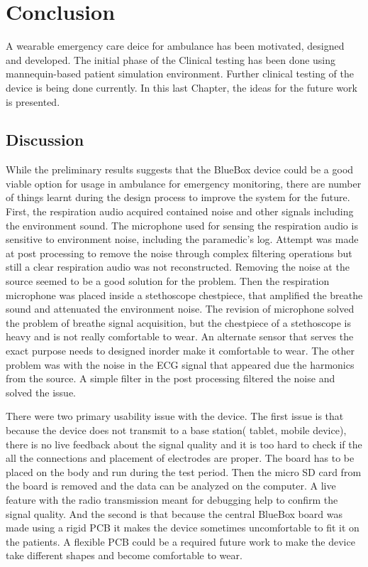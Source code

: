 \chapter{Conclusion}
A wearable emergency care deice for ambulance has been motivated, designed and developed. The initial phase of the Clinical testing has been done using mannequin-based patient simulation environment. Further clinical testing of the device is being done currently. In this last Chapter, the ideas for the future work is presented.

\section{Discussion}
While the preliminary results suggests that the BlueBox device could be a good viable option for usage in ambulance for emergency monitoring, there are number of things learnt during the design process to improve the system for the future. First, the respiration audio acquired contained noise and other signals including the environment sound. The microphone used for sensing the respiration audio is sensitive to environment noise, including the paramedic's log. Attempt was made at post processing to remove the noise through complex filtering operations but still a clear respiration audio was not reconstructed. Removing the noise at the source seemed to be a good solution for the problem. Then the respiration microphone was placed inside a stethoscope chestpiece, that amplified the breathe sound and attenuated the environment noise. The revision of microphone solved the problem of breathe signal acquisition, but the chestpiece of a stethoscope is heavy and is not really comfortable to wear. An alternate sensor that serves the exact purpose needs to designed inorder make it comfortable to wear. The other problem was with the noise in the ECG signal that appeared due the harmonics from the source. A simple filter in the post processing filtered the noise and solved the issue. 

There were two primary usability issue with the device. The first issue is that because the device does not transmit to a base station( tablet, mobile device), there is no live feedback about the signal quality and it is too hard to check if the all the connections and placement of electrodes are proper. The board has to be placed on the body and run during the test period. Then the micro SD card from the board is removed and the data can be analyzed on the computer. A live feature with the radio transmission meant for debugging help to confirm the signal quality. And the second is that because the central BlueBox board was made using a rigid PCB it makes the device sometimes uncomfortable to fit it on the patients. A flexible PCB could be a required future work to make the device take different shapes and become comfortable to wear. 

